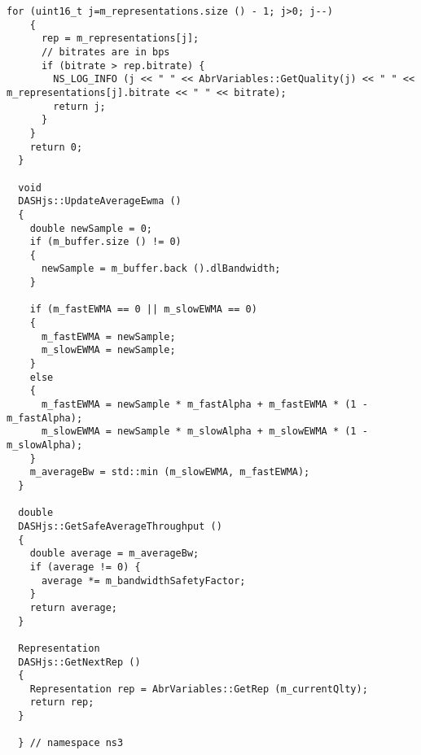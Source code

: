 \begin{lstlisting}[language=myC++, caption={DASHjs.cc}, captionpos=b]
    for (uint16_t j=m_representations.size () - 1; j>0; j--)
    {
      rep = m_representations[j];
      // bitrates are in bps
      if (bitrate > rep.bitrate) {
        NS_LOG_INFO (j << " " << AbrVariables::GetQuality(j) << " " << m_representations[j].bitrate << " " << bitrate);
        return j;
      }
    }
    return 0;
  }
  
  void
  DASHjs::UpdateAverageEwma ()
  {
    double newSample = 0;
    if (m_buffer.size () != 0)
    {
      newSample = m_buffer.back ().dlBandwidth;
    }
  
    if (m_fastEWMA == 0 || m_slowEWMA == 0)
    {
      m_fastEWMA = newSample;
      m_slowEWMA = newSample;
    }
    else
    {
      m_fastEWMA = newSample * m_fastAlpha + m_fastEWMA * (1 - m_fastAlpha);
      m_slowEWMA = newSample * m_slowAlpha + m_slowEWMA * (1 - m_slowAlpha);
    }
    m_averageBw = std::min (m_slowEWMA, m_fastEWMA);
  }
  
  double
  DASHjs::GetSafeAverageThroughput ()
  {
    double average = m_averageBw;
    if (average != 0) {
      average *= m_bandwidthSafetyFactor;
    }
    return average;
  }
  
  Representation
  DASHjs::GetNextRep ()
  {
    Representation rep = AbrVariables::GetRep (m_currentQlty);
    return rep;
  }
  
  } // namespace ns3
  
\end{lstlisting}
